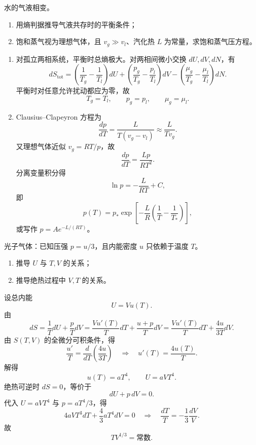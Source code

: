 \begin{question}
水的气液相变。
\begin{enumerate}[label=（\arabic*）,leftmargin=2.8em,itemsep=0.2em]
\item 用熵判据推导气液共存时的平衡条件；
\item 饱和蒸气视为理想气体，且 $v_g\gg v_l$、汽化热 $L$ 为常量，求饱和蒸气压方程。
\end{enumerate}
\begin{solution}
\begin{enumerate}[label=（\arabic*）,leftmargin=2.8em,itemsep=0.2em]
\item 对孤立两相系统，平衡时总熵极大。对两相间微小交换 $dU,dV,dN$，有
\[
dS_{\text{tot}}=\left(\frac1{T_g}-\frac1{T_l}\right)dU+
\left(\frac{p_g}{T_g}-\frac{p_l}{T_l}\right)dV-
\left(\frac{\mu_g}{T_g}-\frac{\mu_l}{T_l}\right)dN.
\]
平衡时对任意允许扰动都应为零，故
\[
T_g=T_l,\qquad p_g=p_l,\qquad \mu_g=\mu_l.
\]
\item Clausius--Clapeyron 方程为
\[
\frac{dp}{dT}=\frac{L}{T(v_g-v_l)}\approx \frac{L}{T v_g}.
\]
又理想气体近似 $v_g=RT/p$，故
\[
\frac{dp}{dT}=\frac{Lp}{RT^2}.
\]
分离变量积分得
\[
\ln p=-\frac{L}{RT}+C,
\]
即
\[
p(T)=p_*\exp\left[-\frac{L}{R}\left(\frac1T-\frac1{T_*}\right)\right],
\]
或写作 $p=Ae^{-L/(RT)}$。
\end{enumerate}
\end{solution}
\end{question}

\begin{question}
光子气体：已知压强 $p=u/3$，且内能密度 $u$ 只依赖于温度 $T$。
\begin{enumerate}[label=（\arabic*）,leftmargin=2.8em,itemsep=0.2em]
\item 推导 $U$ 与 $T,V$ 的关系；
\item 推导绝热过程中 $V,T$ 的关系。
\end{enumerate}
\begin{solution}
设总内能
\[
U=Vu(T).
\]
由
\[
dS=\frac{1}{T}dU+\frac{p}{T}dV
=\frac{V u'(T)}{T}dT+\frac{u+p}{T}dV
=\frac{V u'(T)}{T}dT+\frac{4u}{3T}dV.
\]
由 $S(T,V)$ 的全微分可积条件，得
\[
\frac{u'}{T}=\frac{d}{dT}\left(\frac{4u}{3T}\right)
\quad\Rightarrow\quad
u'(T)=\frac{4u(T)}{T}.
\]
解得
\[
u(T)=aT^4,
\qquad U=aVT^4.
\]
绝热可逆时 $dS=0$，等价于
\[
dU+p\,dV=0.
\]
代入 $U=aVT^4$ 与 $p=aT^4/3$，得
\[
4aVT^3dT+\frac{4}{3}aT^4dV=0
\quad\Rightarrow\quad
\frac{dT}{T}=-\frac13\frac{dV}{V}.
\]
故
\[
TV^{1/3}=\text{常数}.
\]
\end{solution}
\end{question}

